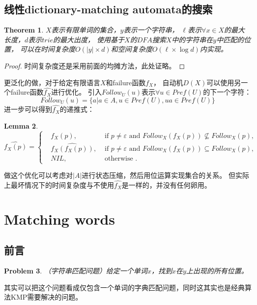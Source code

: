 \documentclass[UTF8]{ctexart}
\newtheorem{thm}{Theorem}[subsection]
\newtheorem{lem}[thm]{Lemma}
\newtheorem{prob}[thm]{Problem}
\theoremstyle{definition}
\theoremstyle{remark}
\numberwithin{equation}{subsection}
\begin{document}
\subsection{线性dictionary-matching automata的搜索}

	\begin{thm}
		$X$表示有限单词的集合，$y$表示一个字符串，
		$\ell$表示$\forall x \in X$的最大长度，$d$表示$trie$的最大出度，
		使用基于$X$的$DFA$搜索$X$中的字符串在$y$中匹配的位置，
		可以在时间复杂度$O(|y| \times d)$和空间复杂度$O(\ell \times \log d)$内实现。
	\end{thm}
	\begin{proof}
		时间复杂度还是采用前面的均摊方法，此处证略。
	\end{proof}
	
	更泛化的做，对于给定有限语言$X$和failure函数$f_X$，
	自动机$D(X)$可以使用另一个failure函数$\hat{f_X}$进行优化。
	引入$Follow_U(u)$表示$\forall u \in Pref(U)$的下一个字符：
	\[
		Follow_U(u) = \{a | a \in A, u \in Pref(U), ua \in Pref(U) \}
	\]
	进一步可以得到$\hat{f_X}$的递推式：
	\begin{lem}
		\[
			\hat{f_X(p)} =
			\left\{
				\begin{aligned}
					&f_X(p),			&\text{ if } p \neq \varepsilon \text{ and } Follow_X(f_X(p)) \nsubseteq Follow_X(p),   \\
					&\hat{f_X(f_X(p))},	&\text{ if } p \neq \varepsilon \text{ and } Follow_X(f_X(p)) \subseteq Follow_X(p),    \\
					&NIL,				&\text{ otherwise }.
				\end{aligned}
			\right .
		\]
	\end{lem}
	做这个优化可以考虑对$|A|$进行状态压缩，然后用位运算实现集合的关系。
	但实际上最坏情况下的时间复杂度与不使用$\hat{f_X}$是一样的，并没有任何卵用。
	
\section{Matching words}

\subsection{前言}	
	
	\begin{prob}
		（字符串匹配问题）给定一个单词$x$，找到$x$在$y$上出现的所有位置。
	\end{prob}
	其实可以把这个问题看成仅包含一个单词的字典匹配问题，同时这其实也是经典算法KMP需要解决的问题。
	
\end{document}
